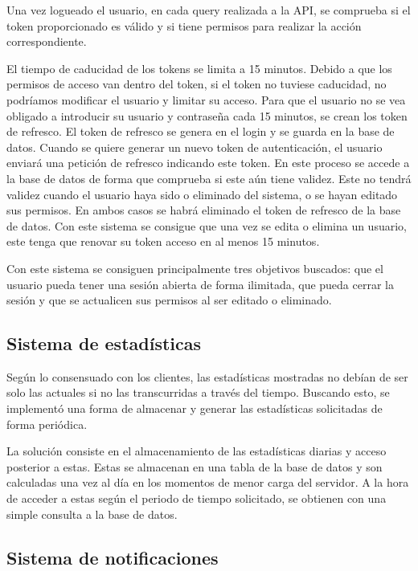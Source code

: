 Una vez logueado el usuario, en cada query realizada a la API, se comprueba si el token proporcionado es válido y si tiene permisos para realizar la acción correspondiente. 

El tiempo de caducidad de los tokens se limita a 15 minutos. Debido a que los permisos de acceso van dentro del token, si el token no tuviese caducidad, no podríamos modificar el usuario y limitar su acceso. Para que el usuario no se vea obligado a introducir su usuario y contraseña cada 15 minutos, se crean los token de refresco. El token de refresco se genera en el login y se guarda en la base de datos. Cuando se quiere generar un nuevo token de autenticación, el usuario enviará una petición de refresco indicando este token. En este proceso se accede a la base de datos de forma que comprueba si este aún tiene validez. Este no tendrá validez cuando el usuario haya sido o eliminado del sistema, o se hayan editado sus permisos. En ambos casos se habrá eliminado el token de refresco de la base de datos. Con este sistema se consigue que una vez se edita o elimina un usuario, este tenga que renovar su token acceso en al menos 15 minutos. 

Con este sistema se consiguen principalmente tres objetivos buscados: que el usuario pueda tener una sesión abierta de forma ilimitada, que pueda cerrar la sesión y que se actualicen sus permisos al ser editado o eliminado.

\subsection{Sistema de estadísticas}

Según lo consensuado con los clientes, las estadísticas mostradas no debían de ser solo las actuales si no las transcurridas a través del tiempo. Buscando esto, se implementó una forma de almacenar y generar las estadísticas solicitadas de forma periódica. 

La solución consiste en el almacenamiento de las estadísticas diarias y acceso posterior a estas. Estas se almacenan en una tabla de la base de datos y son calculadas una vez al día en los momentos de menor carga del servidor. A la hora de acceder a estas según el periodo de tiempo solicitado, se obtienen con una simple consulta a la base de datos. 

\subsection{Sistema de notificaciones}


